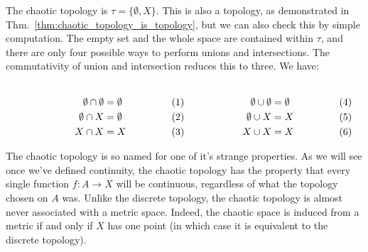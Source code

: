     \begin{example}
        The chaotic topology is $\tau=\{\emptyset,X\}$.
        This is also a topology, as demonstrated in
        Thm.~\ref{thm:chaotic_topology_is_topology}, but we can also check this
        by simple computation. The empty set and the whole space are contained
        within $\tau$, and there are only four possible ways to perform unions
        and intersections. The commutativity of union and intersection reduces
        this to three. We have:
        \par
        \begin{subequations}
            \begin{minipage}[b]{0.49\textwidth}
                \begin{align}
                    \emptyset\cap\emptyset&=\emptyset\\
                    \emptyset\cap{X}&=\emptyset\\
                    X\cap{X}&=X
                \end{align}
            \end{minipage}
            \hfill
            \begin{minipage}[b]{0.49\textwidth}
                \begin{align}
                    \emptyset\cup\emptyset&=\emptyset\\
                    \emptyset\cup{X}&=X\\
                    X\cup{X}&=X
                \end{align}
            \end{minipage}
        \end{subequations}
        \par\vspace{2.5ex}
        The chaotic topology is so named for one of it's strange properties. As
        we will see once we've defined continuity, the chaotic topology has the
        property that every single function $f:A\rightarrow{X}$ will be
        continuous, regardless of what the topology chosen on $A$ was. Unlike
        the discrete topology, the chaotic topology is almost never associated
        with a metric space. Indeed, the chaotic space is induced from a metric
        if and only if $X$ has one point (in which case it is equivalent to
        the discrete topology).
    \end{example}
